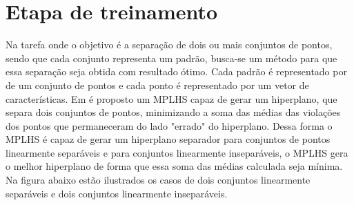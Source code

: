 \section{Etapa de treinamento}
Na tarefa onde o objetivo é a separação de dois ou mais conjuntos de pontos, sendo que cada conjunto representa um padrão, busca-se um método para que essa separação seja obtida com resultado ótimo. Cada padrão é representado por de um conjunto de pontos e cada ponto é representado por um vetor de características.
Em \cite{Bennett92robustlinear} é proposto um MPLHS capaz de gerar um hiperplano, que separa dois conjuntos de pontos, minimizando a soma das médias das violações dos pontos que permaneceram do lado "errado" do hiperplano. Dessa forma o MPLHS é capaz de gerar um hiperplano separador para conjuntos de pontos linearmente separáveis e para conjuntos linearmente inseparáveis, o MPLHS gera o melhor hiperplano de forma que essa soma das médias calculada seja mínima. Na figura abaixo estão ilustrados os casos de dois conjuntos linearmente separáveis e dois conjuntos linearmente inseparáveis.
 
